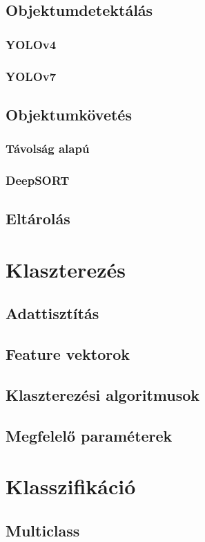 \documentclass[acmtog, authorversion]{acmart}
\begin{document}
\subsection{Objektumdetektálás}
\subsubsection{YOLOv4}
\subsubsection{YOLOv7}
\subsection{Objektumkövetés}
\subsubsection{Távolság alapú}
\subsubsection{DeepSORT}
\subsection{Eltárolás}

\section{Klaszterezés}
\subsection{Adattisztítás}
\subsection{Feature vektorok}
\subsection{Klaszterezési algoritmusok}
\subsection{Megfelelő paraméterek}

\section{Klasszifikáció}
\subsection{Multiclass}
\end{document}

